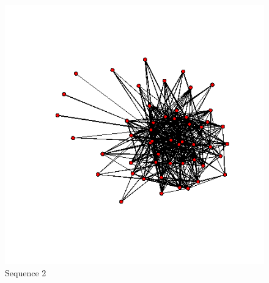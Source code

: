 \documentclass[a4paper, 11pt]{report}
\theoremstyle{definition}
\begin{document}
\begin{figure}[h]
\begin{center}
    \includegraphics[scale=0.26]{pictures/f2_19_nework.png}
    \caption{Sequence 2}
    \end{center}
\end{figure}
\end{document}
